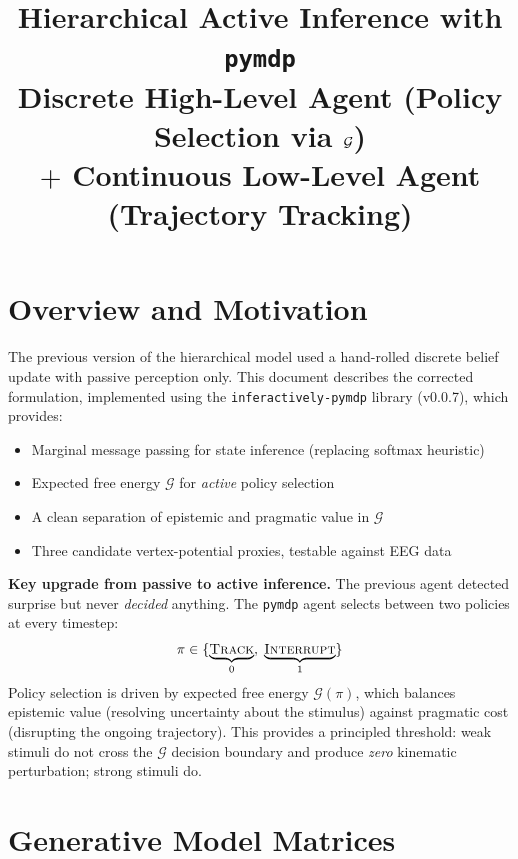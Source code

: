 \documentclass[11pt, a4paper]{article}
\title{%
  \textbf{\Large Hierarchical Active Inference with \texttt{pymdp}}\\[4pt]
  \large Discrete High-Level Agent (Policy Selection via $\EFE$)\\
  $+$ Continuous Low-Level Agent (Trajectory Tracking)
}
\author{}
\date{}
\newcommand{\EFE}{\mathcal{G}}
\begin{document}
\maketitle\thispagestyle{empty}
\tableofcontents\newpage

\section{Overview and Motivation}

The previous version of the hierarchical model used a hand-rolled discrete
belief update with passive perception only. This document describes the
corrected formulation, implemented using the \texttt{inferactively-pymdp}
library (v0.0.7), which provides:

\begin{itemize}[noitemsep]
  \item Marginal message passing for state inference (replacing softmax heuristic)
  \item Expected free energy $\EFE$ for \emph{active} policy selection
  \item A clean separation of epistemic and pragmatic value in $\EFE$
  \item Three candidate vertex-potential proxies, testable against EEG data
\end{itemize}

\begin{keybox}
\textbf{Key upgrade from passive to active inference.}
The previous agent detected surprise but never \emph{decided} anything.
The \texttt{pymdp} agent selects between two policies at every timestep:
\[
  \pi \in \{\underbrace{\textsc{Track}}_{0},\;
            \underbrace{\textsc{Interrupt}}_{1}\}
\]
Policy selection is driven by expected free energy $\EFE(\pi)$, which
balances epistemic value (resolving uncertainty about the stimulus) against
pragmatic cost (disrupting the ongoing trajectory). This provides a principled
threshold: weak stimuli do not cross the $\EFE$ decision boundary and
produce \emph{zero} kinematic perturbation; strong stimuli do.
\end{keybox}

\section{Generative Model Matrices}
\end{document}
